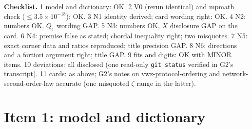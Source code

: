 \documentclass[11pt]{article}
\begin{document}
\noindent\textbf{Checklist.} 1 model and dictionary: OK. 2 V0 (rerun identical) and mpmath check ($\le3.5\times10^{-18}$):
OK. 3 N1 identity derived; card wording right: OK. 4 N2: numbers OK, $Q_1$ wording GAP. 5 N3: numbers OK, $X$
disclosure GAP on the card. 6 N4: premise false as stated; chordal inequality right; two misquotes. 7 N5: exact
corner data and ratios reproduced; title precision GAP. 8 N6: directions and a fortiori argument right; title GAP.
9 fits and digits: OK with MINOR items. 10 deviations: all disclosed (one read-only \texttt{git status} verified in
G2's transcript). 11 cards: as above; G2's notes on vwz-protocol-ordering and network-second-order-law accurate
(one misquoted $\zeta$ range in the latter).

\section{Item 1: model and dictionary}\label{sec:i1}
\end{document}
